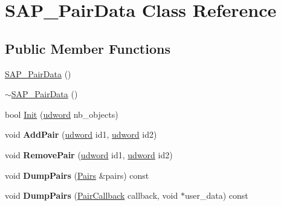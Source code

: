 \hypertarget{class_s_a_p___pair_data}{\section{S\+A\+P\+\_\+\+Pair\+Data Class Reference}
\label{class_s_a_p___pair_data}
}
\subsection*{Public Member Functions}
\begin{DoxyCompactItemize}
\item 
\hyperlink{class_s_a_p___pair_data_a84e9239e2403341cac7ad00dc09487bd}{S\+A\+P\+\_\+\+Pair\+Data} ()
\item 
\hyperlink{class_s_a_p___pair_data_af80f9b6da8804fcefae5b3408979bc8f}{$\sim$\+S\+A\+P\+\_\+\+Pair\+Data} ()
\item 
bool \hyperlink{class_s_a_p___pair_data_ae83191ac5b9f1084b9280c1be61f4d47}{Init} (\hyperlink{_ice_types_8h_a44c6f1920ba5551225fb534f9d1a1733}{udword} nb\+\_\+objects)
\item 
\hypertarget{class_s_a_p___pair_data_a95cd61aec2388f8afc65095961fdb097}{void {\bfseries Add\+Pair} (\hyperlink{_ice_types_8h_a44c6f1920ba5551225fb534f9d1a1733}{udword} id1, \hyperlink{_ice_types_8h_a44c6f1920ba5551225fb534f9d1a1733}{udword} id2)}\label{class_s_a_p___pair_data_a95cd61aec2388f8afc65095961fdb097}

\item 
\hypertarget{class_s_a_p___pair_data_a84609c97cc960c770d7946a4f36a9ef6}{void {\bfseries Remove\+Pair} (\hyperlink{_ice_types_8h_a44c6f1920ba5551225fb534f9d1a1733}{udword} id1, \hyperlink{_ice_types_8h_a44c6f1920ba5551225fb534f9d1a1733}{udword} id2)}\label{class_s_a_p___pair_data_a84609c97cc960c770d7946a4f36a9ef6}

\item 
\hypertarget{class_s_a_p___pair_data_ae04919507b1fce5341800bb5ed22f8e5}{void {\bfseries Dump\+Pairs} (\hyperlink{class_pairs}{Pairs} \&pairs) const }\label{class_s_a_p___pair_data_ae04919507b1fce5341800bb5ed22f8e5}

\item 
\hypertarget{class_s_a_p___pair_data_a3eadd5031707b2ddfb2a2b56e0482190}{void {\bfseries Dump\+Pairs} (\hyperlink{_o_p_c___sweep_and_prune_8h_a552f282bdd0f7430b3a85860f75bbec6}{Pair\+Callback} callback, void $\ast$user\+\_\+data) const }\label{class_s_a_p___pair_data_a3eadd5031707b2ddfb2a2b56e0482190}

\end{DoxyCompactItemize}


